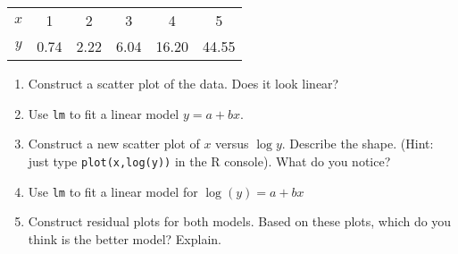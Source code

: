 \documentclass[10pt]{article}
\begin{document}
\begin{enumerate}
  \begin{table}[h!]
    \centering
    \begin{tabular}{cccccc}
      \hline
      $x$ & 1 & 2 & 3 & 4 & 5\\
      $y$ & 0.74 & 2.22 & 6.04 & 16.20 & 44.55\\
      \hline
    \end{tabular}
  \end{table}

  \begin{enumerate}
  \item Construct a scatter plot of the data.  Does it look linear?
    \item Use \verb|lm| to fit a linear model $y = a+bx$.  
    \item Construct a new scatter plot of $x$ versus $\log y$.  Describe the shape. (Hint: just type \verb|plot(x,log(y))| in the R console).  What do you notice?
    \item Use \verb|lm| to fit a linear model for $\log(y) = a+bx$
      \item Construct residual plots for both models.  Based on these plots, which do you think is the better model?  Explain.
  \end{enumerate}

  
\end{enumerate}  
\end{document}
